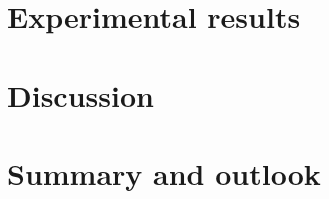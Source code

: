 \documentclass[twoside,english]{uiofysmaster/uiofysmaster}
\begin{document}
\chapter{Experimental results}




\chapter{Discussion}



\chapter{Summary and outlook}






\end{document}
